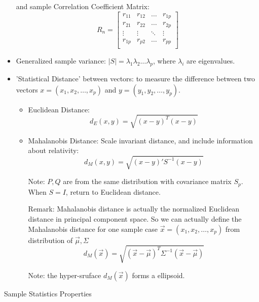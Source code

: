 \begin{itemize}[topsep=6pt,itemsep=4pt]
        and sample Correlation Coefficient Matrix:
        \[
            R_n=
            \begin{bmatrix}
            r_{11}&r_{12}&\ldots&r_{1p}\\
            r_{21}&r_{22}&\ldots&r_{2p}\\
            \vdots&\vdots&\ddots&\vdots\\
            r_{1p}&r_{p2}&\ldots&r_{pp}\\
            \end{bmatrix}
        \]
        \item Generalized sample variance: $ |S|=\lambda _1\lambda _2 \ldots \lambda _p$, where $ \lambda_i  $ are eigenvalues.
        
        \item 'Statistical Distance' between vectors: to measure the difference between two vectors $ x=(x_1,x_2,\ldots,x_p) $ and $ y=(y_1,y_2,\ldots,y_p) $.
        \begin{itemize}[topsep=6pt,itemsep=4pt]
            \item Euclidean Distance:
            \[
                d_E(x,y) =\sqrt{(x-y)^T(x-y)}
            \]
            \item Mahalanobis Distance: Scale invariant distance, and include information about relativity:
            \[
                d_M(x,y)=\sqrt{(x-y)'S^{-1}(x-y)} 
            \]

            Note: $ P,Q $ are from the same distribution with covariance matrix $ S_p $. When $ S=I $, return to Euclidean distance.
            
            Remark: Mahalanobis distance is actually the normalized Euclidean distance in principal component space. So we can actually define the Mahalanobis distance for one sample case $ \vec{x}=(x_1,x_2,\ldots ,x_p) $ from distribution of $ \vec{\mu},\Sigma  $
            \begin{equation}\label{MahalanobisDistance}
                d_M(\vec{x})=\sqrt{(\vec{x}-\vec{\mu})^T\Sigma ^{-1}(\vec{x}-\vec{\mu})} 
            \end{equation}

            Note: the hyper-sruface $ d_M(\vec{x}) $ forms a ellipsoid.

        \end{itemize}
    \end{itemize}

\begin{point}
    \hypertarget{SampleStatisticsProperties}{Sample Statistics Properties}
\end{point}

